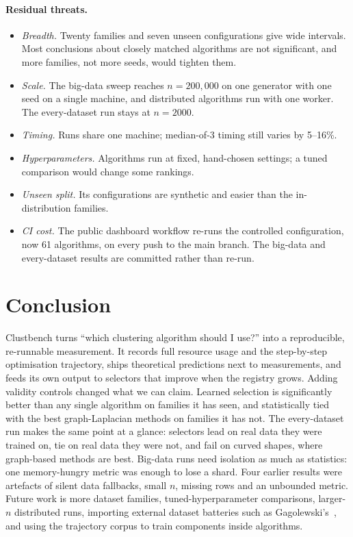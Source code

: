\documentclass[11pt,a4paper]{article}
\begin{document}
\paragraph{Residual threats.}
\begin{itemize}
  \item \emph{Breadth.} Twenty families and seven unseen configurations give
  wide intervals. Most conclusions about closely matched algorithms are not
  significant, and more families, not more seeds, would tighten them.
  \item \emph{Scale.} The big-data sweep reaches $n = 200{,}000$ on one
  generator with one seed on a single machine, and distributed algorithms
  run with one worker. The every-dataset run stays at $n = 2000$.
  \item \emph{Timing.} Runs share one machine; median-of-3 timing still
  varies by 5--16\%.
  \item \emph{Hyperparameters.} Algorithms run at fixed, hand-chosen
  settings; a tuned comparison would change some rankings.
  \item \emph{Unseen split.} Its configurations are synthetic and easier than
  the in-distribution families.
  \item \emph{CI cost.} The public dashboard workflow re-runs the controlled
  configuration, now 61 algorithms, on every push to the main branch. The
  big-data and every-dataset results are committed rather than re-run.
\end{itemize}

\section{Conclusion}
Clustbench turns ``which clustering algorithm should I use?'' into a
reproducible, re-runnable measurement. It records full resource usage and the
step-by-step optimisation trajectory, ships theoretical predictions next to
measurements, and feeds its own output to selectors that improve when the
registry grows. Adding validity controls changed what we can claim. Learned
selection is significantly better than any single algorithm on families it
has seen, and statistically tied with the best graph-Laplacian methods on
families it has not. The every-dataset run makes the same point at a glance:
selectors lead on real data they were trained on, tie on real data they were
not, and fail on curved shapes, where graph-based methods are best. Big-data
runs need isolation as much as statistics: one memory-hungry metric was
enough to lose a shard. Four earlier results were artefacts of silent data
fallbacks, small $n$, missing rows and an unbounded metric. Future work is more dataset families,
tuned-hyperparameter comparisons, larger-$n$ distributed runs, importing
external dataset batteries such as Gagolewski's~\cite{gagolewski2022framework},
and using the trajectory corpus to train components inside algorithms.
\end{document}
